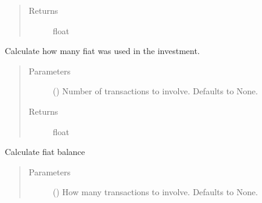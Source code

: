 \documentclass[letterpaper,10pt,english]{sphinxmanual}
\begin{document}
\begin{fulllineitems}
\begin{fulllineitems}
\begin{quote}
\begin{description}
\item[{Returns}] \leavevmode
\sphinxAtStartPar
float

\end{description}\end{quote}

\end{fulllineitems}


\begin{fulllineitems}
\label{\detokenize{Recorder:crypto_env.recorder.Recorder.get_expenditure}}
\sphinxAtStartPar
Calculate how many fiat was used in the investment.
\begin{quote}\begin{description}
\item[{Parameters}] \leavevmode
\sphinxAtStartPar
{} (\sphinxstyleliteralemphasis{\sphinxupquote{, }}) \textendash{} Number of transactions to involve. Defaults to None.

\item[{Returns}] \leavevmode
\sphinxAtStartPar
float

\end{description}\end{quote}

\end{fulllineitems}


\begin{fulllineitems}
\label{\detokenize{Recorder:crypto_env.recorder.Recorder.get_fiat_balance}}
\sphinxAtStartPar
Calculate fiat balance
\begin{quote}\begin{description}
\item[{Parameters}] \leavevmode
\sphinxAtStartPar
{} (\sphinxstyleliteralemphasis{\sphinxupquote{, }}) \textendash{} How many transactions to involve. Defaults to None.


\end{description}
\end{quote}
\end{fulllineitems}
\end{fulllineitems}
\end{document}

